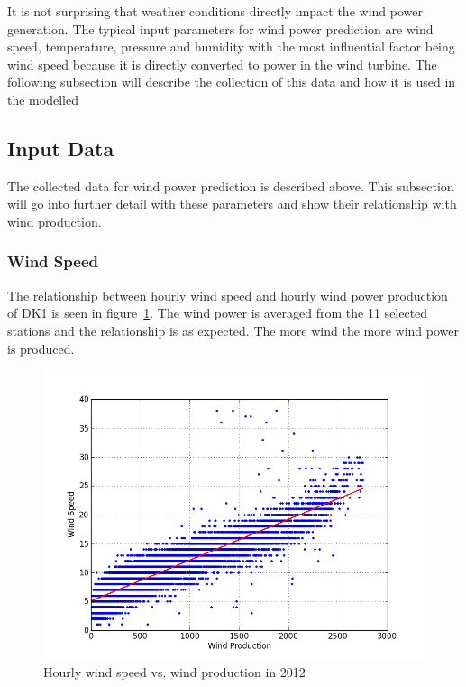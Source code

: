 It is not surprising that weather conditions directly impact the wind power generation. The typical input parameters for wind power prediction are wind speed, temperature, pressure and humidity \cite{WindPowerGenerationUsingANN} with the most influential factor being wind speed because it is directly converted to power in the wind turbine. The following subsection will describe the collection of this data and how it is used in the modelled 

\subsection{Input Data}
The collected data for wind power prediction is described above. This subsection will go into further detail with these parameters and show their relationship with wind production.

\subsubsection{Wind Speed}
The relationship between hourly wind speed and hourly wind power production of DK1 is seen in figure~\ref{fig:windVsProd}. The wind power is averaged from the 11 selected stations and the relationship is as expected. The more wind the more wind power is produced.

\begin{figure}[h!]
\centering
\includegraphics[width=0.99\linewidth,natwidth=898,natheight=587]{billeder/WindSpeedVsProduction.png}
\caption{Hourly wind speed vs. wind production in 2012}
\label{fig:windVsProd}
\end{figure}

